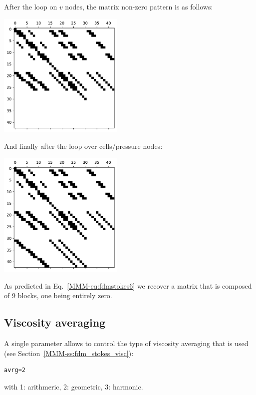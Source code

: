After the loop on $v$ nodes, the matrix non-zero pattern is as follows:
\begin{center}
\includegraphics[width=6cm]{python_codes/fieldstone_158/images/matrix_uv.pdf}
\end{center}

And finally after the loop over cells/pressure nodes:
\begin{center}
\includegraphics[width=6cm]{python_codes/fieldstone_158/images/matrix_uvp.pdf}
\end{center}
As predicted in Eq.~\eqref{MMM-eq:fdmstokes6} we recover a matrix that 
is composed of 9 blocks, one being entirely zero.

\subsection*{Viscosity averaging}

A single parameter allows to control the type of viscosity 
averaging that is used (see Section~\ref{MMM-ss:fdm_stokes_visc}):

\begin{lstlisting}
avrg=2
\end{lstlisting}
with 1: arithmeric, 2: geometric, 3: harmonic.


